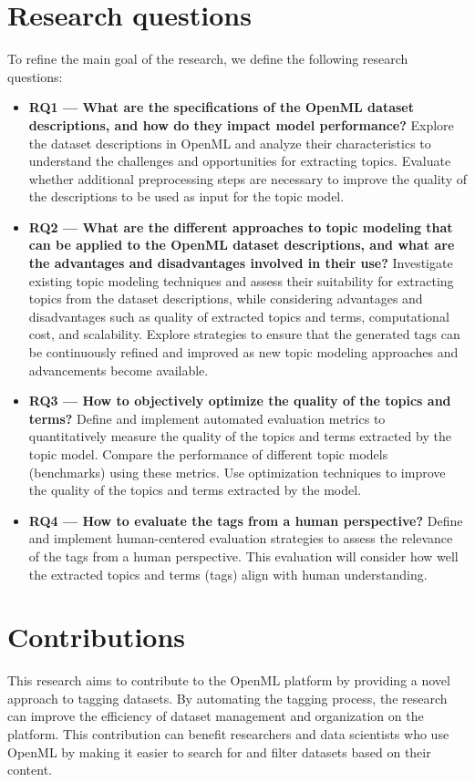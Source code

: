 \section{Research questions}
To refine the main goal of the research, we define the following research questions:
\begin{itemize}
    \item{\textbf{RQ1 — What are the specifications of the OpenML dataset descriptions, and how do they impact model performance?}}\label{rq1} Explore the dataset descriptions in OpenML and analyze their characteristics to understand the challenges and opportunities for extracting topics. Evaluate whether additional preprocessing steps are necessary to improve the quality of the descriptions to be used as input for the topic model.
    \item{\textbf{RQ2 — What are the different approaches to topic modeling that can be applied to the OpenML dataset descriptions, and what are the advantages and disadvantages involved in their use?}}\label{rq2} Investigate existing topic modeling techniques and assess their suitability for extracting topics from the dataset descriptions, while considering advantages and disadvantages such as quality of extracted topics and terms, computational cost, and scalability. Explore strategies to ensure that the generated tags can be continuously refined and improved as new topic modeling approaches and advancements become available.
    \item{\textbf{RQ3 — How to objectively optimize the quality of the topics and terms?}}\label{rq3} Define and implement automated evaluation metrics to quantitatively measure the quality of the topics and terms extracted by the topic model. Compare the performance of different topic models (benchmarks) using these metrics. Use optimization techniques to improve the quality of the topics and terms extracted by the model.
    \item{\textbf{RQ4 —  How to evaluate the tags from a human perspective?}}\label{rq4} Define and implement human-centered evaluation strategies to assess the relevance of the tags from a human perspective. This evaluation will consider how well the extracted topics and terms (tags) align with human understanding.
\end{itemize}

\section{Contributions}
This research aims to contribute to the OpenML platform by providing a novel approach to tagging datasets. By automating the tagging process, the research can improve the efficiency of dataset management and organization on the platform. This contribution can benefit researchers and data scientists who use OpenML by making it easier to search for and filter datasets based on their content.

